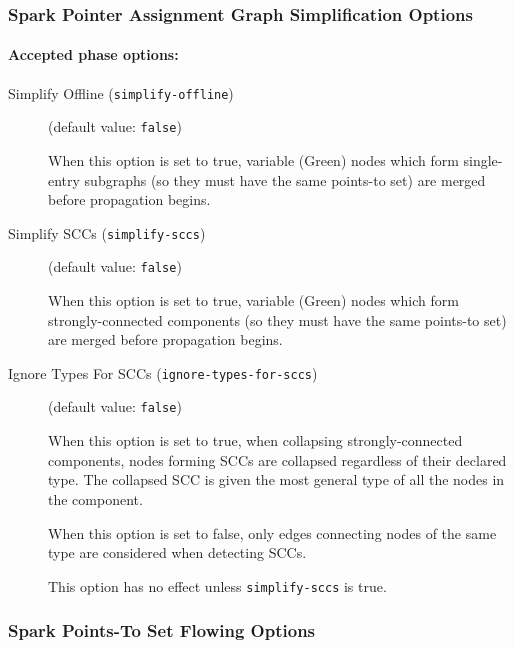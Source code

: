 \documentclass{article}
\begin{document}
\subsubsection{Spark Pointer Assignment Graph Simplification Options}


\paragraph{Accepted phase options:} 

\begin{description}

\item[Simplify Offline ({\tt simplify-offline})]
(default value: {\tt false})




When this option is set to true, variable (Green) nodes which form
single-entry subgraphs (so they must have the same points-to set) are
merged before propagation begins.
        


\item[Simplify SCCs ({\tt simplify-sccs})]
(default value: {\tt false})




When this option is set to true, variable (Green) nodes which form
strongly-connected components (so they must have the same points-to set)
are merged before propagation begins.
        


\item[Ignore Types For SCCs ({\tt ignore-types-for-sccs})]
(default value: {\tt false})




When this option is set to true, when collapsing strongly-connected
components, nodes forming SCCs are collapsed regardless of their declared type.
The collapsed SCC is given the most general type of all the nodes in the
component.

When this option is set to false, only edges connecting nodes of the
same type are considered when detecting SCCs.

This option has no effect unless {\tt simplify-sccs} is true.
        


\end{description}

\subsubsection{Spark Points-To Set Flowing Options}
\end{document}

